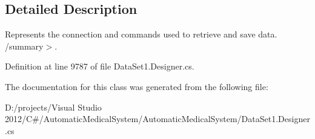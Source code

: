 \subsection{Detailed Description}
Represents the connection and commands used to retrieve and save data. /summary$>$. 

Definition at line 9787 of file DataSet1.Designer.cs.

The documentation for this class was generated from the following file:\begin{CompactItemize}
\item 
D:/projects/Visual Studio 2012/C\#/AutomaticMedicalSystem/AutomaticMedicalSystem/DataSet1.Designer.cs\end{CompactItemize}
